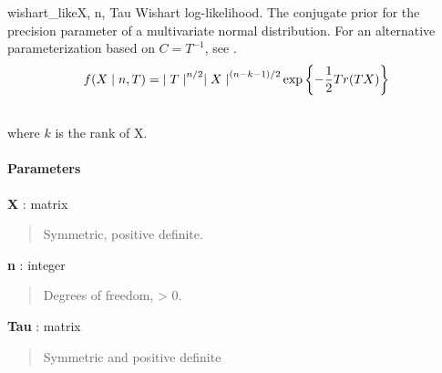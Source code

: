 \begin{funcdesc}{wishart\_like}{X, n, Tau}
\hypertarget{pymc.distributions.wishart_like}{}
Wishart log-likelihood. The conjugate prior for the precision parameter of a multivariate normal distribution. For an alternative parameterization based on $C=T^{-1}$, see 
\hyperlink{pymc.distributions.wishart_cov_like}{}.
\begin{gather}
\begin{split}f(X \mid n, T) = {\mid T \mid}^{n/2}{\mid X \mid}^{(n-k-1)/2} \exp\left\{ -\frac{1}{2} Tr(TX) \right\}\end{split}\notag\\\begin{split}\end{split}\notag
\end{gather}
where $k$ is the rank of X.
\paragraph{Parameters}\begin{paramlist}

\item[] \textbf{X} : matrix
\begin{quote}

Symmetric, positive definite.
\end{quote}

\item[] \textbf{n} : integer
\begin{quote}

Degrees of freedom, \textgreater{} 0.
\end{quote}

\item[] \textbf{Tau} : matrix
\begin{quote}

Symmetric and positive definite
\end{quote}
\end{paramlist}
\end{funcdesc}


